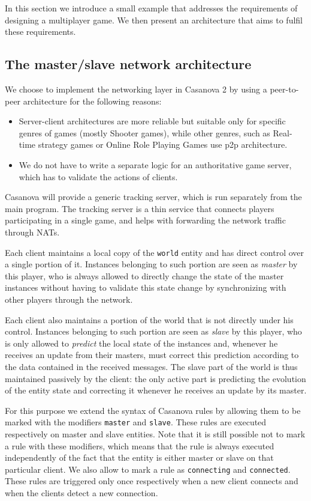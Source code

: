 In this section we introduce a small example that addresses the requirements of designing a multiplayer game. We then present an architecture that aims to fulfil these requirements.

\subsection{The master/slave network architecture}

We choose to implement the networking layer in Casanova 2 by using a peer-to-peer architecture for the following reasons:

\begin{itemize}
	\item Server-client architectures are more reliable but suitable only for specific genres of games (mostly Shooter games), while other genres, such as Real-time strategy games or Online Role Playing Games use p2p architecture.
	\item We do not have to write a separate logic for an authoritative game server, which has to validate the actions of clients.
\end{itemize}

Casanova will provide a generic tracking server, which is run separately from the main program. The tracking server is a thin service that connects players participating in a single game, and helps with forwarding the network traffic through NATs.

Each client maintains a local copy of the \texttt{world} entity and has direct control over a single portion of it. Instances belonging to such portion are seen as \textit{master} by this player, who is always allowed to directly change the state of the master instances without having to validate this state change by synchronizing with other players through the network.

Each client also maintains a portion of the world that is not directly under his control. Instances belonging to such portion are seen as \textit{slave} by this player, who is only allowed to \textit{predict} the local state of the instances and, whenever he receives an update from their masters, must correct this prediction according to the data contained in the received messages. The slave part of the world is thus maintained passively by the client: the only active part is predicting the evolution of the entity state and correcting it whenever he receives an update by its master.

For this purpose we extend the syntax of Casanova rules by allowing them to be marked with the modifiers \texttt{master} and \texttt{slave}. These rules are executed respectively on master and slave entities. Note that it is still possible not to mark a rule with these modifiers, which means that the rule is always executed independently of the fact that the entity is either master or slave on that particular client. We also allow to mark a rule as \texttt{connecting} and \texttt{connected}. These rules are triggered only once respectively when a new client connects and when the clients detect a new connection.

